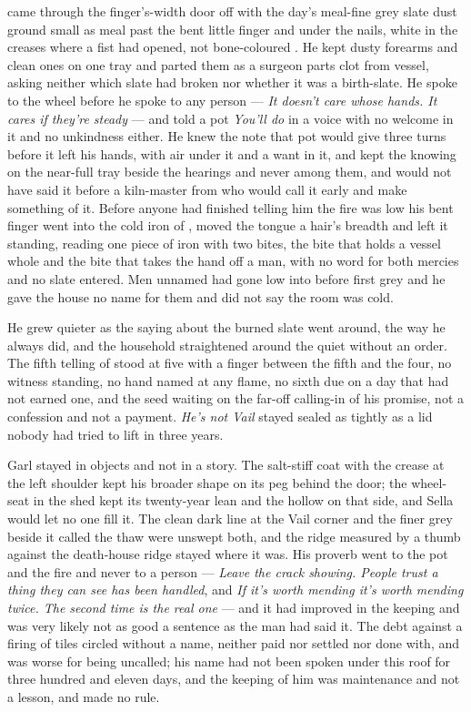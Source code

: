  came through the finger's-width door off  with the day's meal-fine grey slate dust ground small as meal past the bent little finger and under the nails, white in the creases where a fist had opened, not bone-coloured . He kept dusty forearms and clean ones on one tray and parted them as a surgeon parts clot from vessel, asking neither which slate had broken nor whether it was a birth-slate. He spoke to the wheel before he spoke to any person --- \emph{It doesn't care whose hands. It cares if they're steady} --- and told a pot \emph{You'll do} in a voice with no welcome in it and no unkindness either. He knew the note that pot would give three turns before it left his hands, with air under it and a want in it, and kept the knowing on the near-full tray beside the hearings and never among them, and would not have said it before a kiln-master from  who would call it early and make something of it. Before anyone had finished telling him the fire was low his bent finger went into the cold iron of , moved the tongue a hair's breadth and left it standing, reading one piece of iron with two bites, the bite that holds a vessel whole and the bite that takes the hand off a man, with no  word for both mercies and no slate entered. Men unnamed had gone low into  before first grey and he gave the house no name for them and did not say the room was cold.

He grew quieter as the saying about the burned slate went around, the way he always did, and the household straightened around the quiet without an order. The fifth telling of  stood at five with a finger between the fifth and the four, no witness standing, no hand named at any flame, no sixth due on a day that had not earned one, and the seed waiting on the far-off calling-in of his promise, not a confession and not a payment. \emph{He's not Vail} stayed sealed as tightly as a lid nobody had tried to lift in three years.

Garl stayed in objects and not in a story. The salt-stiff coat with the crease at the left shoulder kept his broader shape on its peg behind the door; the wheel-seat in the shed kept its twenty-year lean and the hollow on that side, and Sella would let no one fill it. The clean dark line at the Vail corner and the finer grey beside it called the thaw were unswept both, and the ridge measured by a thumb against the death-house ridge stayed where it was. His proverb went to the pot and the fire and never to a person --- \emph{Leave the crack showing. People trust a thing they can see has been handled}, and \emph{If it's worth mending it's worth mending twice. The second time is the real one} --- and it had improved in the keeping and was very likely not as good a sentence as the man had said it. The debt against a firing of tiles circled without a name, neither paid nor settled nor done with, and was worse for being uncalled; his name had not been spoken under this roof for three hundred and eleven days, and the keeping of him was maintenance and not a lesson, and made no rule.

